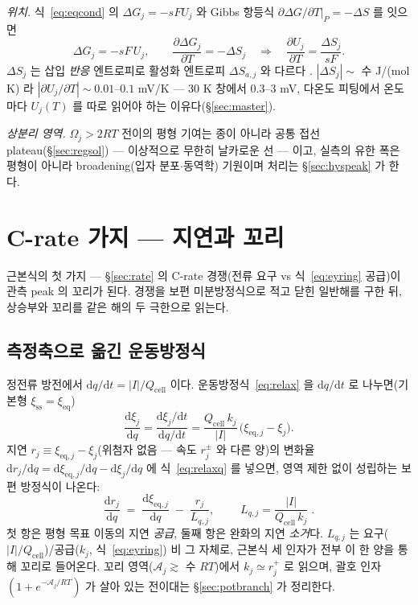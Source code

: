 \documentclass[11pt,a4paper]{article}
\newcommand{\dd}{\mathrm{d}}
\newcommand{\eq}{\mathrm{eq}}
\newcommand{\cell}{\mathrm{cell}}
\newcommand{\sstat}{\mathrm{ss}}
\begin{document}
\emph{위치.} 식~\eqref{eq:eqcond} 의 $\Delta G_j=-sFU_j$ 와 Gibbs 항등식 $\partial\Delta G/\partial T|_P=-\Delta S$ 를 잇으면
\begin{equation}
\Delta G_j=-sF\,U_j,\qquad
\frac{\partial\Delta G_j}{\partial T}=-\Delta S_j
\quad\Longrightarrow\quad
\frac{\partial U_j}{\partial T}=\frac{\Delta S_j}{sF}.
\label{eq:dUdT}
\end{equation}
$\Delta S_j$ 는 삽입 \emph{반응} 엔트로피로 활성화 엔트로피 $\Delta S_{a,j}$ 와 다르다 \cite{reynier2004}. $|\Delta S_j|\sim$ 수 J/(mol\,K) 라 $|\partial U_j/\partial T|\sim0.01$--$0.1$ mV/K — $30$ K 창에서 $0.3$--$3$ mV, 다온도 피팅에서 온도마다 $U_j(T)$ 를 따로 읽어야 하는 이유다(\S\ref{sec:master}).

\emph{상분리 영역.} $\Omega_j>2RT$ 전이의 평형 기여는 종이 아니라 공통 접선 plateau(\S\ref{sec:regsol}) — 이상적으로 무한히 날카로운 선 — 이고, 실측의 유한 폭은 평형이 아니라 broadening(입자 분포$\cdot$동역학) 기원이며 처리는 \S\ref{sec:hyspeak} 가 한다.

\section{C-rate 가지 — 지연과 꼬리}\label{sec:lag}
근본식의 첫 가지 — \S\ref{sec:rate} 의 C-rate 경쟁(전류 요구 vs 식~\eqref{eq:eyring} 공급)이 관측 peak 의 꼬리가 된다. 경쟁을 보편 미분방정식으로 적고 닫힌 일반해를 구한 뒤, 상승부와 꼬리를 같은 해의 두 극한으로 읽는다.

\subsection{측정축으로 옮긴 운동방정식}
정전류 방전에서 $\dd q/\dd t=|I|/Q_\cell$ 이다. 운동방정식~\eqref{eq:relax} 을 $\dd q/\dd t$ 로 나누면(기본형 $\xi_{\sstat}=\xi_{\eq}$)
\begin{equation}
\frac{\dd\xi_j}{\dd q}
=\frac{\dd\xi_j/\dd t}{\dd q/\dd t}
=\frac{Q_\cell\,k_j}{|I|}\,\big(\xi_{\eq,j}-\xi_j\big).
\label{eq:relaxq}
\end{equation}
지연 $r_j\equiv\xi_{\eq,j}-\xi_j$(위첨자 없음 — 속도 $r_j^\pm$ 와 다른 양)의 변화율 $\dd r_j/\dd q=\dd\xi_{\eq,j}/\dd q-\dd\xi_j/\dd q$ 에 식~\eqref{eq:relaxq} 를 넣으면, 영역 제한 없이 성립하는 보편 방정식이 나온다:
\begin{equation}
\frac{\dd r_j}{\dd q}\;=\;\frac{\dd\xi_{\eq,j}}{\dd q}\;-\;\frac{r_j}{L_{q,j}},\qquad
\boxed{\;L_{q,j}=\frac{|I|}{Q_\cell\,k_j}\;.}
\label{eq:Lq}
\end{equation}
첫 항은 평형 목표 이동의 지연 \emph{공급}, 둘째 항은 완화의 지연 \emph{소거}다. $L_{q,j}$ 는 요구($|I|/Q_\cell$)/공급($k_j$, 식~\eqref{eq:eyring}) 비 그 자체로, 근본식 세 인자가 전부 이 한 양을 통해 꼬리로 들어온다. 꼬리 영역($\mathcal A_j\gtrsim$ 수 $RT$)에서 $k_j\simeq r_j^+$ 로 읽으며, 괄호 인자 $(1+e^{-\mathcal A_j/RT})$ 가 살아 있는 전이대는 \S\ref{sec:potbranch} 가 정리한다.
\end{document}
